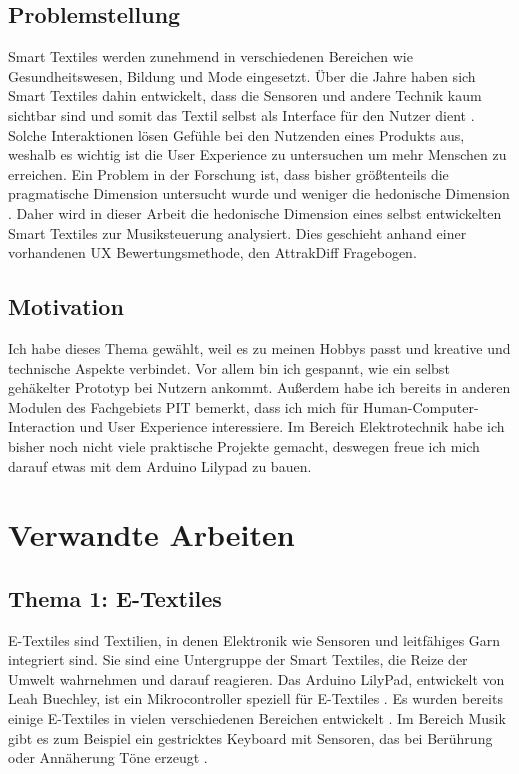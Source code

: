\documentclass[12pt, a4paper]{article}
\begin{document}
\subsection{Problemstellung}
Smart Textiles werden zunehmend in verschiedenen Bereichen wie Gesundheitswesen, Bildung und Mode eingesetzt. Über die Jahre haben sich Smart Textiles dahin entwickelt, dass die Sensoren und andere Technik kaum sichtbar sind und somit das Textil selbst als Interface für den Nutzer dient \parencite{ruckdashel2022smart}. Solche Interaktionen lösen Gefühle bei den Nutzenden eines Produkts aus, weshalb es wichtig ist die User Experience zu untersuchen um mehr Menschen zu erreichen. Ein Problem in der Forschung ist, dass bisher größtenteils die pragmatische Dimension untersucht wurde und weniger die hedonische Dimension \parencite{guennes2025smart}. Daher wird in dieser Arbeit die hedonische Dimension eines selbst entwickelten Smart Textiles zur Musiksteuerung analysiert. Dies geschieht anhand einer vorhandenen UX Bewertungsmethode, den AttrakDiff Fragebogen.

\subsection{Motivation}
Ich habe dieses Thema gewählt, weil es zu meinen Hobbys passt und kreative und technische Aspekte verbindet. Vor allem bin ich gespannt, wie ein selbst gehäkelter Prototyp bei Nutzern ankommt. Außerdem habe ich bereits in anderen Modulen des Fachgebiets PIT bemerkt, dass ich mich für Human-Computer-Interaction und User Experience interessiere. Im Bereich Elektrotechnik habe ich bisher noch nicht viele praktische Projekte gemacht, deswegen freue ich mich darauf etwas mit dem Arduino Lilypad zu bauen.


\section{Verwandte Arbeiten}

\subsection{Thema 1: E-Textiles}

E-Textiles sind Textilien, in denen Elektronik wie Sensoren und leitfähiges Garn integriert sind. Sie sind eine Untergruppe der Smart Textiles, die Reize der Umwelt wahrnehmen und darauf reagieren. Das Arduino LilyPad, entwickelt von Leah Buechley, ist ein Mikrocontroller speziell für E-Textiles \parencite{buechley2008lilypad}. Es wurden bereits einige E-Textiles in vielen verschiedenen Bereichen entwickelt \parencite{younes2023smart}. Im Bereich Musik gibt es zum Beispiel ein gestricktes Keyboard mit Sensoren, das bei Berührung oder Annäherung Töne erzeugt \parencite{wicaksono2020knittedkeyboard}.
\end{document}
